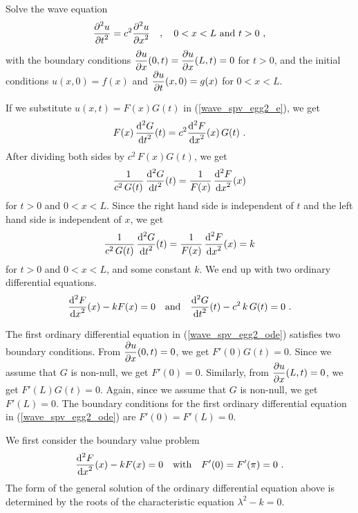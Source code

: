 \begin{egg}
Solve the wave equation
\begin{equation} \label{wave_spv_egg2_e}
\frac{\displaystyle \partial^{2}{u}} {\displaystyle \partial t^{2}} = c^2 \frac{\displaystyle \partial^{2}{u}} {\displaystyle \partial x^{2}}  \quad ,
\quad 0 < x < L \text{ and } t>0 \ ,
\end{equation}
with the boundary conditions
$\displaystyle \frac{\partial{u}}{\partial x}(0,t) = \frac{\partial{u}}{\partial x}(L,t) = 0$ for
$t>0$, and the initial conditions
$u(x,0) = f(x)$ and $\displaystyle \frac{\partial{u}}{\partial t}(x,0) = g(x)$
for $0<x<L$.           \label{wave_spv_egg2}

If we substitute $u(x,t) = F(x)G(t)$ in (\ref{wave_spv_egg2_e}), we get
\[
F(x)\,\frac{\displaystyle \mathrm{d}^{2}{G}} {\displaystyle \mathrm{d}{t}^{2}}(t) = c^2 \frac{\displaystyle \mathrm{d}^{2}{F}} {\displaystyle \mathrm{d}{x}^{2}}(x)\, G(t) \ .
\]
After dividing both sides by $\displaystyle c^2\,F(x)G(t)$, we get
\[
\frac{1}{c^2\,G(t)} \, \frac{\displaystyle \mathrm{d}^{2}{G}} {\displaystyle \mathrm{d}{t}^{2}}(t) =
\frac{1}{F(x)}\, \frac{\displaystyle \mathrm{d}^{2}{F}} {\displaystyle \mathrm{d}{x}^{2}}(x)
\]
for $t>0$ and $0<x<L$.
Since the right hand side is independent of $t$ and the left hand side
is independent of $x$, we get
\[
\frac{1}{c^2\,G(t)} \, \frac{\displaystyle \mathrm{d}^{2}{G}} {\displaystyle \mathrm{d}{t}^{2}}(t) = \frac{1}{F(x)}\,
\frac{\displaystyle \mathrm{d}^{2}{F}} {\displaystyle \mathrm{d}{x}^{2}}(x) = k
\]
for $t>0$ and $0<x<L$, and some constant $k$.  We end up with two
ordinary differential equations.
\begin{equation} \label{wave_spv_egg2_ode}
\frac{\displaystyle \mathrm{d}^{2}{F}} {\displaystyle \mathrm{d}{x}^{2}}(x) -k F(x) = 0 \quad \text{and}
\quad \frac{\displaystyle \mathrm{d}^{2}{G}} {\displaystyle \mathrm{d}{t}^{2}}(t) - c^2\,k\,G(t) = 0 \ .
\end{equation}

The first ordinary differential equation in (\ref{wave_spv_egg2_ode})
satisfies two boundary conditions.   From
$\displaystyle \frac{\partial{u}}{\partial x}(0,t) = 0$, we get
$F'(0)G(t)=0$.  Since we assume that $G$ is non-null, we get
$F'(0)=0$.  Similarly, from $\displaystyle \frac{\partial{u}}{\partial x}(L,t) = 0$, we
get $F'(L)G(t)=0$.  Again, since we assume that $G$ is non-null, we
get $F'(L)=0$.  The boundary conditions for 
the first ordinary differential equation in
(\ref{wave_spv_egg2_ode}) are $F'(0)=F'(L)=0$.

We first consider the boundary value problem
\begin{equation} \label{wave_spv_egg2_bvp}
\frac{\displaystyle \mathrm{d}^{2}{F}} {\displaystyle \mathrm{d}{x}^{2}}(x) -k F(x) = 0 \quad \text{with} \quad F'(0)=F'(\pi)=0  \ .
\end{equation}
The form of the general solution of the ordinary differential equation
above is determined by the roots of the characteristic equation
$\displaystyle \lambda^2-k=0$.


\end{egg}
